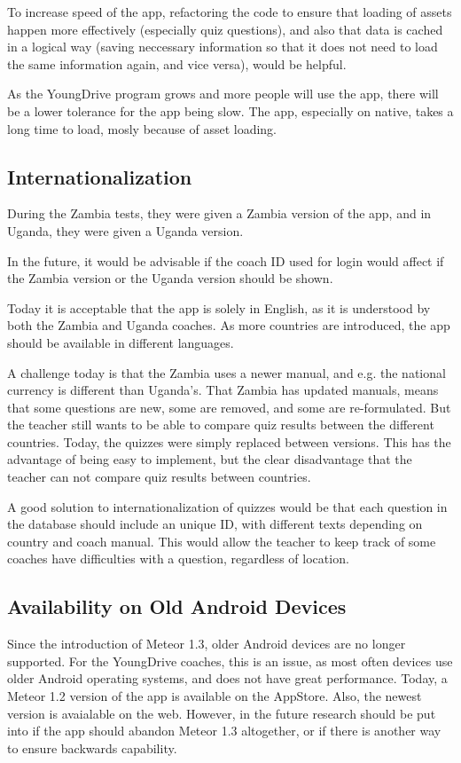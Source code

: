 To increase speed of the app, refactoring the code to ensure that loading of assets happen more effectively (especially quiz questions), and also that data is cached in a logical way (saving neccessary information so that it does not need to load the same information again, and vice versa), would be helpful.

As the YoungDrive program grows and more people will use the app, there will be a lower tolerance for the app being slow. The app, especially on native, takes a long time to load, mosly because of asset loading.

\subsection{Internationalization}
During the Zambia tests, they were given a Zambia version of the app, and in Uganda, they were given a Uganda version.

In the future, it would be advisable if the coach ID used for login would affect if the Zambia version or the Uganda version should be shown.

Today it is acceptable that the app is solely in English, as it is understood by both the Zambia and Uganda coaches. As more countries are introduced, the app should be available in different languages.

A challenge today is that the Zambia uses a newer manual, and e.g. the national currency is different than Uganda's. That Zambia has updated manuals, means that some questions are new, some are removed, and some are re-formulated. But the teacher still wants to be able to compare quiz results between the different countries. Today, the quizzes were simply replaced between versions. This has the advantage of being easy to implement, but the clear disadvantage that the teacher can not compare quiz results between countries.

A good solution to internationalization of quizzes would be that each question in the database should include an unique ID, with different texts depending on country and coach manual. This would allow the teacher to keep track of some coaches have difficulties with a question, regardless of location.

\subsection{Availability on Old Android Devices}
Since the introduction of Meteor 1.3, older Android devices are no longer supported. For the YoungDrive coaches, this is an issue, as most often devices use older Android operating systems, and does not have great performance. Today, a Meteor 1.2 version of the app is available on the AppStore. Also, the newest version is avaialable on the web. However, in the future research should be put into if the app should abandon Meteor 1.3 altogether, or if there is another way to ensure backwards capability.

